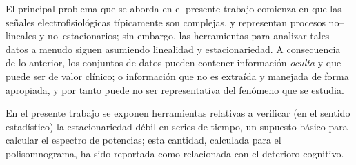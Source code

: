 El principal problema que se aborda en el presente trabajo comienza en que las señales
electrofisiológicas típicamente son complejas, y representan procesos no--lineales y 
no--estacionarios; sin embargo, las herramientas para analizar tales datos a menudo siguen 
asumiendo linealidad y estacionariedad.
A consecuencia de lo anterior, los conjuntos de datos pueden contener
información \textit{oculta} y que puede ser de valor clínico; o información que no es extraída y 
manejada de forma apropiada, y por tanto puede no ser representativa del fenómeno que se estudia. 

En el presente trabajo se exponen herramientas relativas a verificar (en el sentido estadístico)
la estacionariedad débil en series de tiempo, un supuesto básico para calcular el espectro de potencias; esta cantidad,
calculada para el polisomnograma,
ha sido reportada como relacionada con el deterioro cognitivo\cite{Amer13,Miyata13,Reid06,Potvin12}.




